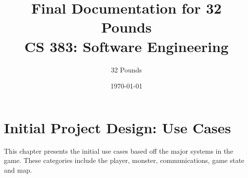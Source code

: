 \documentclass[12pt]{report}
\begin{document}
\title{Final Documentation for 32 Pounds\\ \vspace{2 mm} {\large CS 383: Software Engineering}}

\author{32 Pounds}
\date{\today}
\maketitle
\clearpage

\chapter{Initial Project Design: Use Cases}
This chapter presents the initial use cases based off the major systems in the game. These categories
include the player, monster, communications, game state and map.
  
\end{document}
